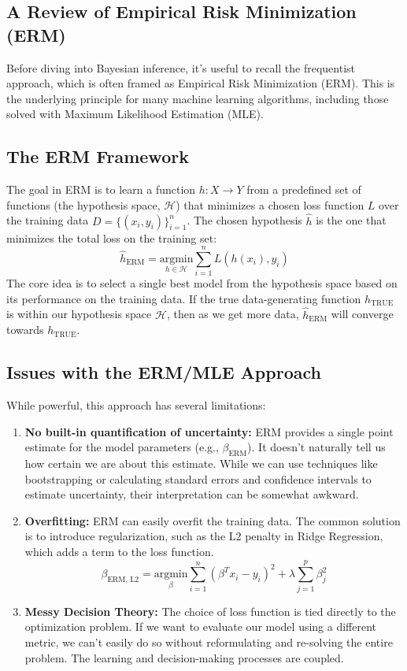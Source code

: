 \documentclass{article}
\begin{document}
\begin{multicols}{2}
	\section{A Review of Empirical Risk Minimization (ERM)}
	Before diving into Bayesian inference, it's useful to recall the frequentist approach, which is often framed as Empirical Risk Minimization (ERM). This is the underlying principle for many machine learning algorithms, including those solved with Maximum Likelihood Estimation (MLE).

	\subsection{The ERM Framework}
	The goal in ERM is to learn a function $h: X \rightarrow Y$ from a predefined set of functions (the hypothesis space, $\mathcal{H}$) that minimizes a chosen loss function $L$ over the training data $D = \{(x_i, y_i)\}_{i=1}^n$.
	The chosen hypothesis $\hat{h}$ is the one that minimizes the total loss on the training set:
	$$ \hat{h}_{\text{ERM}} = \underset{h \in \mathcal{H}}{\text{argmin}} \sum_{i=1}^{n} L(h(x_i), y_i) $$
	The core idea is to select a single best model from the hypothesis space based on its performance on the training data. If the true data-generating function $h_{\text{TRUE}}$ is within our hypothesis space $\mathcal{H}$, then as we get more data, $\hat{h}_{\text{ERM}}$ will converge towards $h_{\text{TRUE}}$.

	\subsection{Issues with the ERM/MLE Approach}
	While powerful, this approach has several limitations:
	\begin{enumerate}
		\item \textbf{No built-in quantification of uncertainty:} ERM provides a single point estimate for the model parameters (e.g., $\beta_{\text{ERM}}$). It doesn't naturally tell us how certain we are about this estimate. While we can use techniques like bootstrapping or calculating standard errors and confidence intervals to estimate uncertainty, their interpretation can be somewhat awkward.
		\item \textbf{Overfitting:} ERM can easily overfit the training data. The common solution is to introduce regularization, such as the L2 penalty in Ridge Regression, which adds a term to the loss function.
		      $$ \beta_{\text{ERM, L2}} = \underset{\beta}{\text{argmin}} \sum_{i=1}^{n} (\beta^T x_i - y_i)^2 + \lambda \sum_{j=1}^{p} \beta_j^2 $$
		\item \textbf{Messy Decision Theory:} The choice of loss function is tied directly to the optimization problem. If we want to evaluate our model using a different metric, we can't easily do so without reformulating and re-solving the entire problem. The learning and decision-making processes are coupled.
	\end{enumerate}


\end{multicols}
\end{document}
